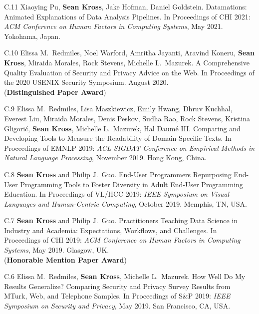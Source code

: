 \begin{bibenum}

\item[C.11] Xiaoying Pu, \textbf{Sean Kross}, Jake Hofman, Daniel Goldstein. 
Datamations: Animated Explanations of Data Analysis Pipelines.
In Proceedings of CHI 2021: \emph{ACM Conference on Human Factors in Computing 
Systems}, May 2021. Yokohama, Japan.

\item[C.10] Elissa M.\ Redmiles, Noel Warford, Amritha Jayanti, Aravind Koneru,
\textbf{Sean Kross}, Miraida Morales, Rock Stevens, Michelle L.\ Mazurek.
A Comprehensive Quality Evaluation of Security and Privacy Advice on the Web. 
In Proceedings of the 2020 USENIX Security Symposium. August 2020.
\\ ({\textbf{Distinguished Paper Award}})

\item[C.9] Elissa M.\ Redmiles, Lisa Maszkiewicz, Emily Hwang, Dhruv Kuchhal,
Everest Liu, Miraida Morales, Denis Peskov, Sudha Rao, Rock Stevens, 
Kristina Gligorić, \textbf{Sean Kross}, Michelle L.\ Mazurek, Hal Daumé III.
Comparing and Developing Tools to Measure the Readability of Domain-Specific 
Texts. In Proceedings of EMNLP 2019: \emph{ACL SIGDAT Conference on Empirical 
Methods in Natural Language Processing}, November 2019. Hong Kong, China.

\item[C.8] \textbf{Sean Kross} and Philip J.\ Guo. End-User Programmers 
Repurposing End-User Programming Tools to Foster Diversity in Adult End-User 
Programming Education. In Proceedings of VL/HCC 2019: \emph{IEEE
Symposium on Visual Languages and Human-Centric Computing}, October 2019. 
Memphis, TN, USA.


\item[C.7] \textbf{Sean Kross} and Philip J.\ Guo. Practitioners Teaching Data 
Science in Industry and Academia: Expectations, Workflows, and Challenges.
In Proceedings of CHI 2019: \emph{ACM Conference on Human Factors in Computing 
Systems}, May 2019. Glasgow, UK. \\ ({\textbf{Honorable Mention Paper Award}})

\item[C.6] Elissa M.\ Redmiles, \textbf{Sean Kross}, Michelle L.\ Mazurek. 
How Well Do My Results Generalize? Comparing Security and Privacy Survey Results
from MTurk, Web, and Telephone Samples. In Proceedings of S\&P 2019: 
\emph{IEEE Symposium on Security and Privacy}, May 2019. San Francisco, CA, USA.


\end{bibenum}

